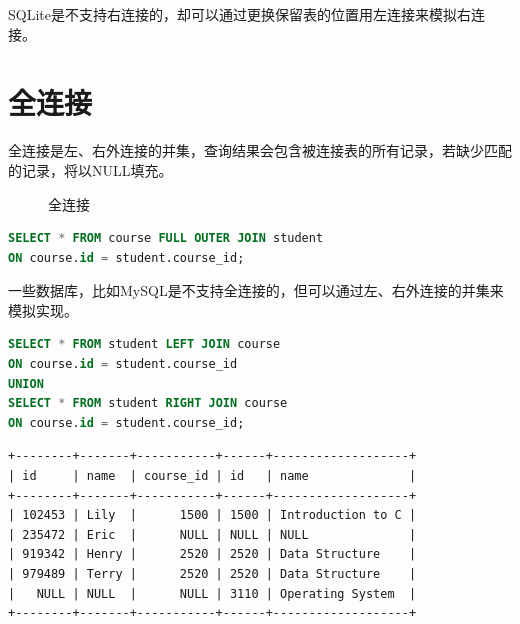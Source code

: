 \documentclass[12pt, openany, oneside]{book}
\begin{document}
SQLite是不支持右连接的，却可以通过更换保留表的位置用左连接来模拟右连接。

\section{全连接}

全连接是左、右外连接的并集，查询结果会包含被连接表的所有记录，若缺少匹配的记录，将以NULL填充。 \\

\begin{figure}[H]
    \centering
    \caption{全连接}
\end{figure}


\begin{lstlisting}[language=SQL]
SELECT * FROM course FULL OUTER JOIN student
ON course.id = student.course_id;
\end{lstlisting}

一些数据库，比如MySQL是不支持全连接的，但可以通过左、右外连接的并集来模拟实现。 \\


\begin{lstlisting}[language=SQL]
SELECT * FROM student LEFT JOIN course
ON course.id = student.course_id
UNION
SELECT * FROM student RIGHT JOIN course
ON course.id = student.course_id;
\end{lstlisting}

\begin{tcolorbox}
    \begin{verbatim}
+--------+-------+-----------+------+-------------------+
| id     | name  | course_id | id   | name              |
+--------+-------+-----------+------+-------------------+
| 102453 | Lily  |      1500 | 1500 | Introduction to C |
| 235472 | Eric  |      NULL | NULL | NULL              |
| 919342 | Henry |      2520 | 2520 | Data Structure    |
| 979489 | Terry |      2520 | 2520 | Data Structure    |
|   NULL | NULL  |      NULL | 3110 | Operating System  |
+--------+-------+-----------+------+-------------------+
	\end{verbatim}
\end{tcolorbox}
\end{document}
